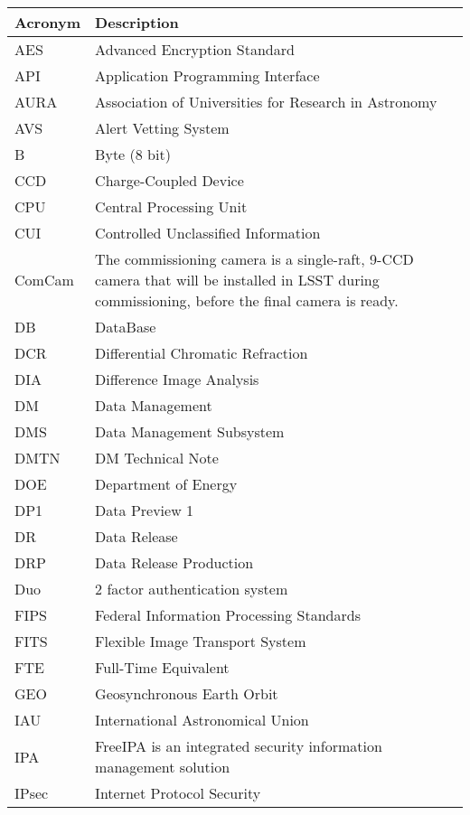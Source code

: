 \addtocounter{table}{-1}
\begin{longtable}{p{}p{}}\hline
\textbf{Acronym} & \textbf{Description}  \\\hline

AES & Advanced Encryption Standard \\\hline
API & Application Programming Interface \\\hline
AURA & Association of Universities for Research in Astronomy \\\hline
AVS & Alert Vetting System \\\hline
B & Byte (8 bit) \\\hline
CCD & Charge-Coupled Device \\\hline
CPU & Central Processing Unit \\\hline
CUI & Controlled Unclassified Information \\\hline
ComCam & The commissioning camera is a single-raft, 9-CCD camera that will be installed in LSST during commissioning, before the final camera is ready. \\\hline
DB & DataBase \\\hline
DCR & Differential Chromatic Refraction \\\hline
DIA & Difference Image Analysis \\\hline
DM & Data Management \\\hline
DMS & Data Management Subsystem \\\hline
DMTN & DM Technical Note \\\hline
DOE & Department of Energy \\\hline
DP1 & Data Preview 1 \\\hline
DR & Data Release \\\hline
DRP & Data Release Production \\\hline
Duo & 2 factor authentication system \\\hline
FIPS & Federal Information Processing Standards \\\hline
FITS & Flexible Image Transport System \\\hline
FTE & Full-Time Equivalent \\\hline
GEO & Geosynchronous Earth Orbit  \\\hline
IAU & International Astronomical Union \\\hline
IPA & FreeIPA is an integrated security information management solution \\\hline
IPsec & Internet Protocol Security \\\hline

\end{longtable}
